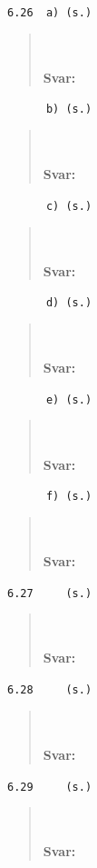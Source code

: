\documentclass[a4paper]{article}
\newcommand{\tskcol}[1]{\textcolor{tskcol}{#1}}
\begin{document}
	\texttt{\tskcol{6.26~~a) (s.)}}
	\begin{quotation}
		\noindent
		\\ \\
		\textbf{Svar:}
	\end{quotation}
	
	\texttt{\tskcol{~~~~~~b) (s.)}}
	\begin{quotation}
		\noindent
		\\ \\
		\textbf{Svar:}
	\end{quotation}
	
	\texttt{\tskcol{~~~~~~c) (s.)}}
	\begin{quotation}
		\noindent
		\\ \\
		\textbf{Svar:}
	\end{quotation}
	
	\texttt{\tskcol{~~~~~~d) (s.)}}
	\begin{quotation}
		\noindent
		\\ \\
		\textbf{Svar:}
	\end{quotation}
	
	\texttt{\tskcol{~~~~~~e) (s.)}}
	\begin{quotation}
		\noindent
		\\ \\
		\textbf{Svar:}
	\end{quotation}
	
	\texttt{\tskcol{~~~~~~f) (s.)}}
	\begin{quotation}
		\noindent
		\\ \\
		\textbf{Svar:}
	\end{quotation}
	
	\texttt{\tskcol{6.27~~~~ (s.)}}
	\begin{quotation}
		\noindent
		\\ \\
		\textbf{Svar:}
	\end{quotation}
	
	\texttt{\tskcol{6.28~~~~ (s.)}}
	\begin{quotation}
		\noindent
		\\ \\
		\textbf{Svar:}
	\end{quotation}
	
	\texttt{\tskcol{6.29~~~~ (s.)}}
	\begin{quotation}
		\noindent
		\\ \\
		\textbf{Svar:}
	\end{quotation}
	
\end{document}
